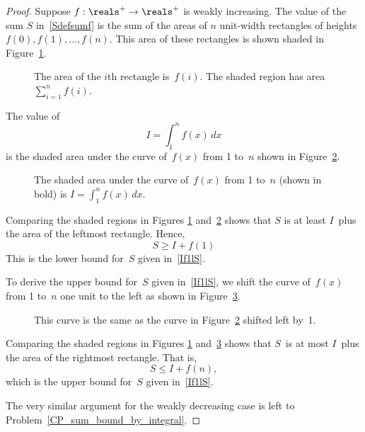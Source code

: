 \begin{proof}
Suppose $f: \reals^+ \to \reals^+$ is weakly increasing.  The value of
the sum $S$ in~\eqref{Sdefsumf} is the sum of the areas of $n$
unit-width rectangles of heights $f(0), f(1),\dots, f(n)$.  This area
of these rectangles is shown shaded in Figure~\ref{fig:9G4}.

\begin{figure}


\caption{The area of the $i$th rectangle is~$f(i)$.  The shaded region
has area $\sum_{i = 1}^n f(i)$.}

\label{fig:9G4}

\end{figure}

The value of
\[
    I = \int_1^n f(x) \, dx
\]
is the shaded area under the curve of~$f(x)$ from 1 to~$n$ shown in
Figure~\ref{fig:9G5}.

\begin{figure}


\caption{The shaded area under the curve of~$f(x)$ from 1 to~$n$
  (shown in bold) is $I = \int_1^n f(x)\, dx$.}

\label{fig:9G5}

\end{figure}

Comparing the shaded regions in Figures \ref{fig:9G4}
and~\ref{fig:9G5} shows that $S$ is at least $I$~plus the area of the
leftmost rectangle.  Hence,
\begin{equation}\label{eqn:9G7}
    S \ge I + f(1)
\end{equation}
This is the lower bound for~$S$ given in~\eqref{If1lS}.

To derive the upper bound for~$S$ given in~\eqref{If1lS}, we shift the
curve of~$f(x)$ from 1 to~$n$ one unit to the left as shown in
Figure~\ref{fig:9G6}.
\iffalse This is the same as the curve~$f(x + 1)$ from 0 to~$n - 1$
and it has the same area~$I$.  \fi

\begin{figure}


\caption{This curve is the same as the curve in Figure~\ref{fig:9G5}
  shifted left by~1.}

\label{fig:9G6}

\end{figure}

Comparing the shaded regions in Figures \ref{fig:9G4}
and~\ref{fig:9G6} shows that $S$~is at most $I$~plus the area of the
rightmost rectangle.  That is,
\[
S \le I + f(n),
\]
which is the upper bound for~$S$ given in~\eqref{If1lS}.

The very similar argument for the weakly decreasing case is left to
Problem~\ref{CP_sum_bound_by_integral}.

\end{proof}

